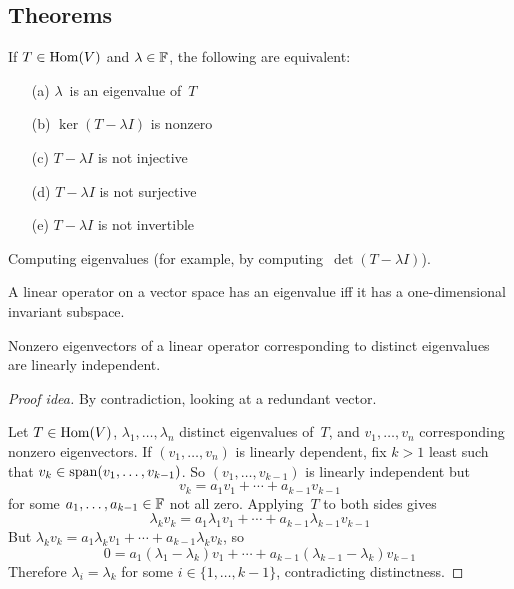\subsection*{Theorems}
\begin{thm}
If \(T\in\operatorname{Hom}(V)\) and \(\lambda\in\mathbb{F}\), the following are equivalent:
\begin{enumerate}[itemsep=0pt]
\item[(a)] \(\lambda\)~is an eigenvalue of~\(T\)
\item[(b)] \(\ker(T-\lambda I)\) is nonzero
\item[(c)] \(T-\lambda I\) is not injective
\item[(d)] \(T-\lambda I\) is not surjective
\item[(e)] \(T-\lambda I\) is not invertible
\end{enumerate}
\end{thm}
\begin{app}
Computing eigenvalues (for example, by computing~\(\det(T-\lambda I)\)).
\end{app}

\begin{thm}
A linear operator on a vector space has an eigenvalue iff it has a one-dimensional invariant subspace.
\end{thm}

\begin{thm}
Nonzero eigenvectors of a linear operator corresponding to distinct eigenvalues are linearly independent.
\end{thm}
\begin{proof}[Proof idea]
By contradiction, looking at a redundant vector.

Let \(T\in\operatorname{Hom}(V)\), \(\lambda_1,\ldots,\lambda_n\) distinct eigenvalues of~\(T\), and \(v_1,\ldots,v_n\) corresponding nonzero eigenvectors. If \((v_1,\ldots,v_n)\) is linearly dependent, fix \(k>1\) least such that \(v_k\in\operatorname{span}(v_1,\ldots,v_{k-1})\). So \((v_1,\ldots,v_{k-1})\) is linearly independent but 
\[v_k=a_1v_1+\cdots+a_{k-1}v_{k-1}\]
for some \(a_1,\ldots,a_{k-1}\in\mathbb{F}\) not all zero. Applying~\(T\) to both sides gives
\[\lambda_kv_k=a_1\lambda_1v_1+\cdots+a_{k-1}\lambda_{k-1}v_{k-1}\]
But \(\lambda_kv_k=a_1\lambda_kv_1+\cdots+a_{k-1}\lambda_kv_k\), so
\[0=a_1(\lambda_1-\lambda_k)v_1+\cdots+a_{k-1}(\lambda_{k-1}-\lambda_k)v_{k-1}\]
Therefore \(\lambda_i=\lambda_k\) for some \(i\in\{1,\ldots,k-1\}\), contradicting distinctness.
\end{proof}

